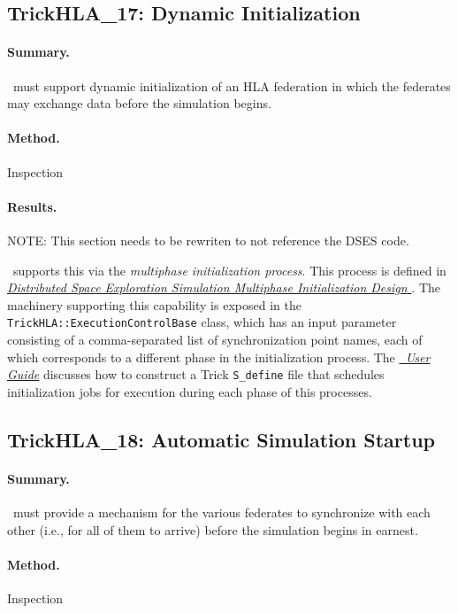 \subsection{TrickHLA\_17: Dynamic Initialization}
\paragraph{Summary.}
\TrickHLA\ must support dynamic initialization of an HLA federation
in which the federates may exchange data before the simulation begins.
\paragraph{Method.} Inspection
\paragraph{Results.}
NOTE: This section needs to be rewriten to not reference the DSES code.

\TrickHLA\ supports this via the {\em multiphase initialization process}.
This process is defined in
{
  \href{file:DSES\_Multiphase\_Init\_Design\_Document.pdf}
  {\em
    Distributed Space Exploration Simulation Multiphase Initialization Design
  }
}
\cite{trickhlaenv:DSES-multiphase-init-design}.
The machinery supporting this capability is exposed in the
{\tt TrickHLA::ExecutionControlBase} class, which has an input parameter consisting
of a comma-separated list of synchronization point names, each of which
corresponds to a different phase in the initialization process.
The \href{file:TrickHLAUser.pdf} {\em \TrickHLA\ User Guide}
discusses how to construct a Trick {\tt S\_define} file
that schedules initialization jobs for execution during each phase of this
processes.

\subsection{TrickHLA\_18: Automatic Simulation Startup}
\paragraph{Summary.}
\TrickHLA\ must provide a mechanism for the various federates to
synchronize with each other (i.e., for all of them to arrive)
before the simulation begins in earnest.
\paragraph{Method.} Inspection
